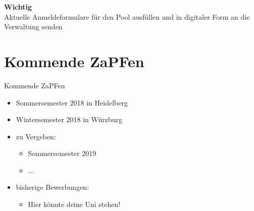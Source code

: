 \documentclass[compress, aspectratio=169]{beamer}
\begin{document}
\begin{frame}
  \begin{framed}
    \begin{center}
      {\Huge \textbf{Wichtig}}\\
      \vspace{0.5cm}
      {\Large Aktuelle Anmeldeformulare für den Pool ausfüllen und in digitaler Form an die Verwaltung senden}
      \end{center}
      \end{framed}
\end{frame}



\section{Kommende ZaPFen}
\begin{frame}{Kommende ZaPFen}
  \begin{itemize}
    \item Sommersemester 2018 in Heidelberg
    \item Wintersemester 2018 in Würzburg
    \item zu Vergeben:
      \begin{itemize}
      \item Sommersemester 2019
      \item ...
      \end{itemize}
    \item bisherige Bewerbungen:
      \begin{itemize}
      \item Hier könnte deine Uni stehen!
      \end{itemize}
    \end{itemize}
\end{frame}
\end{document}
